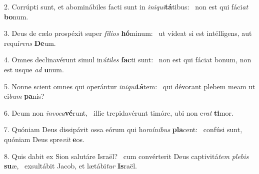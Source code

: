 2. Corrúpti sunt, et abominábiles facti sunt in \textit{in}\textit{i}\textit{qui}\textbf{tá}tibus: \ast\  non est qui fáci\textit{at} \textbf{bo}num.\

3. Deus de cælo prospéxit super \textit{fí}\textit{li}\textit{os} \textbf{hó}minum: \ast\  ut vídeat si est intélligens, aut requí\textit{rens} \textbf{De}um.\

4. Omnes declinavérunt simul in\textit{ú}\textit{ti}\textit{les} \textbf{fac}ti sunt: \ast\  non est qui fáciat bonum, non est usque \textit{ad} \textbf{u}num.\

5. Nonne scient omnes qui operántur \textit{in}\textit{i}\textit{qui}\textbf{tá}tem: \ast\  qui dévorant plebem meam ut ci\textit{bum} \textbf{pa}nis?\

6. Deum non \textit{in}\textit{vo}\textit{ca}\textbf{vé}runt, \ast\  illic trepidavérunt timóre, ubi non e\textit{rat} \textbf{ti}mor.\

7. Quóniam Deus dissipávit ossa eórum qui ho\textit{mí}\textit{ni}\textit{bus} \textbf{pla}cent: \ast\  confúsi sunt, quóniam Deus spre\textit{vit} \textbf{e}os.\

8. Quis dabit ex Sion salutáre Israël? \dag\  cum convérterit Deus captivitá\textit{tem} \textit{ple}\textit{bis} \textbf{su}æ, \ast\  exsultábit Jacob, et lætábi\textit{tur} \textbf{Is}raël.\

